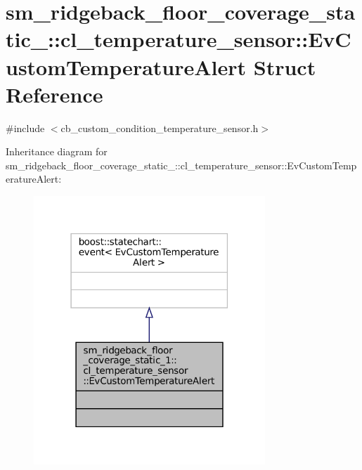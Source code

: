 \hypertarget{structsm__ridgeback__floor__coverage__static__1_1_1cl__temperature__sensor_1_1EvCustomTemperatureAlert}{}\section{sm\+\_\+ridgeback\+\_\+floor\+\_\+coverage\+\_\+static\+\_\+:\+:cl\+\_\+temperature\+\_\+sensor\+:\+:Ev\+Custom\+Temperature\+Alert Struct Reference}
\label{structsm__ridgeback__floor__coverage__static__1_1_1cl__temperature__sensor_1_1EvCustomTemperatureAlert}


{\ttfamily \#include $<$cb\+\_\+custom\+\_\+condition\+\_\+temperature\+\_\+sensor.\+h$>$}



Inheritance diagram for sm\+\_\+ridgeback\+\_\+floor\+\_\+coverage\+\_\+static\+\_\+:\+:cl\+\_\+temperature\+\_\+sensor\+:\+:Ev\+Custom\+Temperature\+Alert\+:
\nopagebreak
\begin{figure}[H]
\begin{center}
\leavevmode
\includegraphics[width=247pt]{structsm__ridgeback__floor__coverage__static__1_1_1cl__temperature__sensor_1_1EvCustomTemperatureAlert__inherit__graph}
\end{center}
\end{figure}


